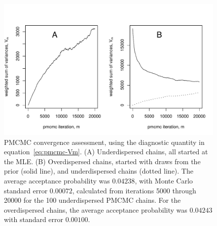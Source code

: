 \documentclass[11pt]{article}
\newcommand\reviewerVersion[2]{#1} %
\begin{document}
\begin{figure}
\begin{center}


\reviewerVersion{
\vspace{-3mm}

\includegraphics[width=6.5in]{figS1}

\vspace{-8mm}

}
{\medskip\texttt{Figure pdf in figS1.pdf. For review, please view supp-if2-review.pdf.}

\vspace{5mm}}


\end{center}
\caption{PMCMC convergence assessment, using the diagnostic quantity in equation~\ref{eq:pmcmc-Vm}. (A) Underdispersed chains, all started at the MLE. (B) Overdispersed chains, started with draws from the prior (solid line), and underdispersed chains (dotted line).
The average acceptance probability was $0.04238$, with Monte Carlo standard error $0.00072$, calculated from iterations 5000 through 20000 for the 100 underdispersed PMCMC chains.  For the overdispersed chains, the average acceptance probability was $0.04243$ with standard error $0.00100$.
}\label{fig:pmcmc-varplot}
\end{figure}
\end{document}
